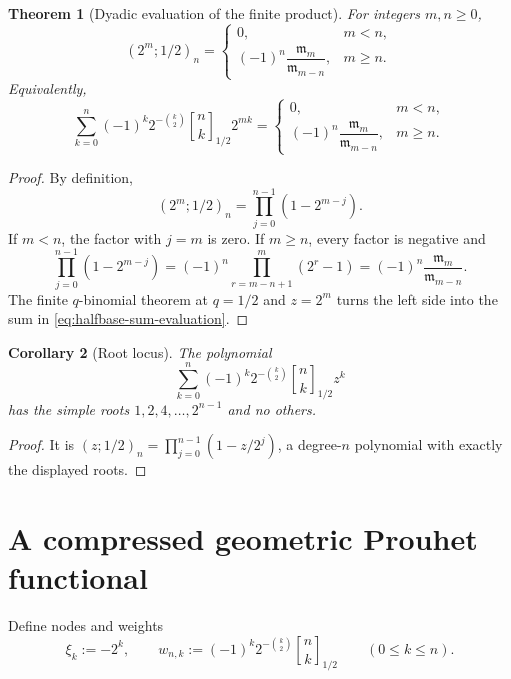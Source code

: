 \documentclass[11pt,oneside,openany]{book}
\newtheorem{theorem}{Theorem}[chapter]
\newtheorem{corollary}[theorem]{Corollary}
\theoremstyle{definition}
\theoremstyle{remark}
\newcommand{\Qbinom}[3]{\genfrac{[}{]}{0pt}{}{#1}{#2}_{#3}}
\begin{document}
\begin{theorem}[Dyadic evaluation of the finite product]\label{thm:dyadic-product-evaluation}
For integers $m,n\ge0$,
\begin{equation}\label{eq:dyadic-product-evaluation}
 (2^m;1/2)_n
 =
 \begin{cases}
  0,&m<n,\\[3pt]
  (-1)^n\dfrac{\mathfrak m_m}{\mathfrak m_{m-n}},&m\ge n.
 \end{cases}
\end{equation}
Equivalently,
\begin{equation}\label{eq:halfbase-sum-evaluation}
 \sum_{k=0}^{n}(-1)^k2^{-\binom k2}
 \Qbinom nk{1/2}2^{mk}
 =
 \begin{cases}
  0,&m<n,\\[3pt]
  (-1)^n\dfrac{\mathfrak m_m}{\mathfrak m_{m-n}},&m\ge n.
 \end{cases}
\end{equation}
\end{theorem}

\begin{proof}
By definition,
\[
 (2^m;1/2)_n=\prod_{j=0}^{n-1}(1-2^{m-j}).
\]
If $m<n$, the factor with $j=m$ is zero.  If $m\ge n$, every factor is negative and
\[
 \prod_{j=0}^{n-1}(1-2^{m-j})
 =(-1)^n\prod_{r=m-n+1}^{m}(2^r-1)
 =(-1)^n\frac{\mathfrak m_m}{\mathfrak m_{m-n}}.
\]
The finite $q$-binomial theorem at $q=1/2$ and $z=2^m$ turns the left side into the sum in \eqref{eq:halfbase-sum-evaluation}.
\end{proof}

\begin{corollary}[Root locus]\label{cor:halfbase-root-locus}
The polynomial
\[
 \sum_{k=0}^{n}(-1)^k2^{-\binom k2}\Qbinom nk{1/2}z^k
\]
has the simple roots $1,2,4,\ldots,2^{n-1}$ and no others.
\end{corollary}

\begin{proof}
It is $(z;1/2)_n=\prod_{j=0}^{n-1}(1-z/2^j)$, a degree-$n$ polynomial with exactly the displayed roots.
\end{proof}

\section{A compressed geometric Prouhet functional}

Define nodes and weights
\begin{equation}\label{eq:halfbase-prouhet-data}
 \xi_k:=-2^k,
 \qquad
 w_{n,k}:=(-1)^k2^{-\binom k2}\Qbinom nk{1/2}
 \qquad(0\le k\le n).
\end{equation}
\end{document}
